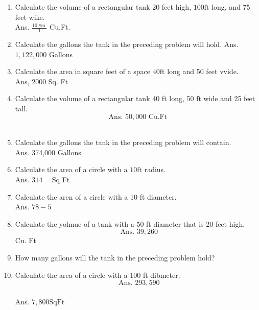 \documentclass{article}
\begin{document}
\begin{enumerate}
\item Calculate the volume of a rectangular tank 20 feet high, $100 \mathrm{ft}$ long, and 75 feet wike.\\
Ans. $\frac{10 \text { wo }}{1}$ Cu.Ft.\\

\item Calculate the gallons the tank in the preceding problem will hold. Ans. $1,122,000$ Gallons\\

\item Calculate the area in square feet of a space $40 \mathrm{ft}$ long and 50 feet vvide.\\
Ans, 2000 Sq. Ft\\

\item Calculate the volume of a rectangular tank 40 ft long, 50 ft wide and 25 feet tall.\\
$$\text { Ans. } 50,000 \text { Cu.Ft }$$\\

\item Calculate the gallons the tank in the preceding problem will contain.\\
Ans. 374,000 Gallons\\


\item Calculate the area of a circle with a $10 \mathrm{ft}$ radius.\\
Ans. $314 \quad$ Sq Ft\\

\item Calculate the aren of a circle with a 10 ft diameter.\\
Ans. $78-5$\\

\item Calculate the yolmue of a tank with a 50 ft diameter that is 20 feet high.\\
$$\text { Ans. } 39,260$$Cu. Ft\\

\item How many gallons will the tank in the preceding problem hold?\\

\item Calculate the area of a circle with a 100 ft dibmeter.\\
$$\text { Ans. } 293,590$$\\
Ans. $7,800 \mathrm{Sq} \mathrm{Ft}$\\


\end{enumerate}
\end{document}
